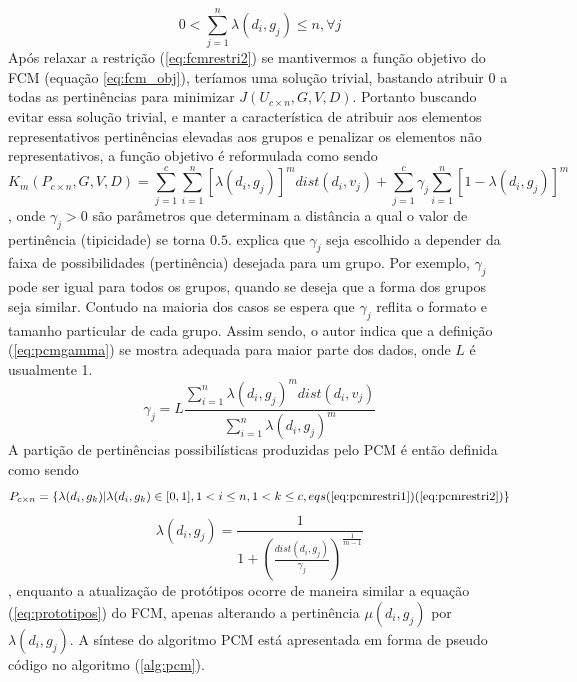 \begin{equation}
  0 < \sum_{j=1}^n \lambda(d_i, g_j) \leq n, \forall j
  \label{eq:pcmrestri2}
\end{equation}
Após relaxar a restrição (\ref{eq:fcmrestri2}) se mantivermos a função objetivo do FCM 
(equação \ref{eq:fcm_obj}), teríamos uma solução trivial, bastando atribuir $0$ a todas as
pertinências para minimizar $J(U_{c \times n},G,V,D)$\cite{Krishnapuram1993}\cite{Nogueira2013}. 
Portanto buscando evitar essa solução trivial, e 
manter a característica de atribuir aos elementos representativos pertinências elevadas aos grupos e 
penalizar os elementos não representativos, a função objetivo é reformulada como sendo 
\begin{equation}
  K_m(P_{c \times n},G,V,D) = \sum_{j=1}^c \sum_{i=1}^n [\lambda(d_i, g_j)]^m dist(d_i, v_j) +
  \sum_{j=1}^c \gamma_j \sum_{i=1}^n [1 - \lambda(d_i, g_j)]^m
  \label{eq:pcmobj}
\end{equation}
, onde $\gamma_j > 0$ são parâmetros que determinam a distância a qual o valor de pertinência
(tipicidade) se torna $0.5$. \cite{Krishnapuram1993} explica que $\gamma_j$ seja escolhido
a depender da faixa de possibilidades (pertinência) desejada para um grupo. Por exemplo, 
$\gamma_j$ pode ser igual para todos os grupos, quando se deseja que a forma dos grupos seja similar.
Contudo na maioria dos casos se espera que $\gamma_j$ reflita o formato e tamanho particular de cada
grupo. Assim sendo, o autor indica que a definição (\ref{eq:pcmgamma}) se mostra adequada para maior
parte dos dados, onde $L$ é usualmente 1.
\begin{equation}
  \gamma_j = L \frac{\sum_{i=1}^n \lambda(d_i,g_j)^m dist(d_i,v_j)}{\sum_{i=1}^n \lambda(d_i,g_j)^m}
  \label{eq:pcmgamma}
\end{equation}
A partição de pertinências possibilísticas produzidas pelo PCM é então definida como sendo
\begin{equation} 
  P_{c \times n} = \{\lambda(d_i, g_k) |\lambda(d_i, g_k) \in [0,1], 1 < i \leq n, 1 < k \leq c, eqs
  (\ref{eq:pcmrestri1})(\ref{eq:pcmrestri2})\}
  \label{eq:pcmpart} 
\end{equation} 
\begin{equation}
  \lambda(d_i,g_j) = \frac{1}{1+\left(\frac{dist(d_i,g_j)}{\gamma_j}\right)^{\frac{1}{m-1}}}
  \label{eq:lambda}
\end{equation}
, enquanto a atualização de protótipos ocorre de maneira similar a equação (\ref{eq:prototipos}) do
FCM, apenas alterando a pertinência $\mu(d_i,g_j)$ por $\lambda(d_i,g_j)$. A síntese do 
algoritmo PCM está apresentada em forma de pseudo código no algoritmo (\ref{alg:pcm}). 

